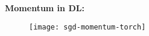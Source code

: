 \documentclass[aspectratio=149]{beamer}
\begin{document}
\begin{frame}
  \frametitle{}

  \begin{minipage}{0.3\textwidth}
    \textbf{Momentum in DL:}
  \end{minipage}
  \begin{minipage}{0.6\textwidth}
    \begin{figure}[ht]
      \centering
      \texttt{[image: sgd-momentum-torch]}
    \end{figure}
  \end{minipage}

\end{frame}
\end{document}

